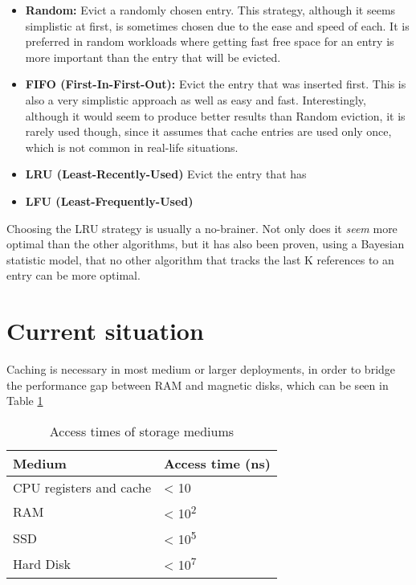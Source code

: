 %
\begin{itemize}
	\item \textbf{Random:} Evict a randomly chosen entry. This strategy, 
		although it seems simplistic at first, is sometimes chosen due 
		to the ease and speed of each. It is preferred in random 
		workloads where getting fast free space for an entry is more 
		important than the entry that will be evicted.
	\item \textbf{FIFO (First-In-First-Out):} Evict the entry that was 
		inserted first. This is also a very simplistic approach as well 
		as easy and fast.  Interestingly, although it would seem to 
		produce better results than Random eviction, it is rarely used 
		though, since it assumes that cache entries are used only once, 
		which is not common in real-life situations.
	\item \textbf{LRU (Least-Recently-Used)}
		Evict the entry that has
	\item \textbf{LFU (Least-Frequently-Used)}
\end{itemize}

Choosing the LRU strategy is usually a no-brainer. Not only does it 
\textit{seem} more optimal than the other algorithms, but it has also been 
proven, using a Bayesian statistic model, that no other algorithm that tracks 
the last K references to an entry can be more optimal.

\section{Current situation}

Caching is necessary in most medium or larger deployments, in order to bridge 
the performance gap between RAM and magnetic disks, which can be seen in Table 
\ref{tab:gap}

\begin{table}
	\centering
	\begin{tabular}{ | l | l | }
		\hline
		Medium & Access time (ns) \\ \hline \hline
		CPU registers and cache & < 10 \\ \hline
		RAM & < 10\textsuperscript{2}  \\ \hline
		SSD & < 10\textsuperscript{5} \\ \hline
		Hard Disk & < 10\textsuperscript{7} \\ \hline
	\end{tabular}
	\caption{Access times of storage mediums}
	\label{tab:gap}
\end{table}

